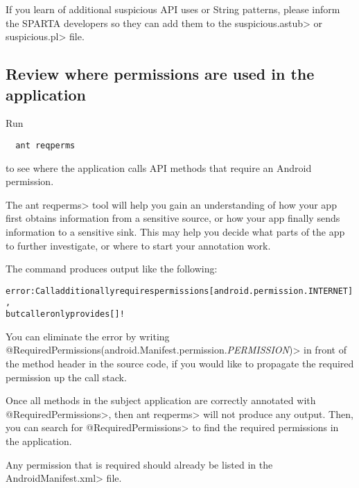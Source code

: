 If you learn of additional suspicious API uses or String patterns, please
inform the SPARTA developers so they can add them to the
\<suspicious.astub> or \<suspicious.pl> file.


\subsection{Review where permissions are used in the application}
\label{sec:appanalysis/reqperms}


Run

\begin{Verbatim}
  ant reqperms
\end{Verbatim}

\noindent
to see where the application calls API methods that require an Android permission.  

The \<ant reqperms> tool will help you gain an understanding of how your
app first obtains information from a sensitive source, or how your app
finally sends information to a sensitive sink.  This may help you decide
what parts of the app to further investigate, or where to start your
annotation work.

The command produces output like the following:
\begin{alltt}
error: Call additionally requires permissions [android.permission.INTERNET], 
   but caller only provides []!
\end{alltt}
You can eliminate the error by writing
\<@RequiredPermissions({android.Manifest.permission.\emph{PERMISSION}})> in
front of the method header in the source code, if you would like to propagate the
required permission up the call stack. 

Once all methods in the subject application are correctly annotated with
\<@RequiredPermissions>, then \<ant reqperms> will not produce any output.
Then, you can search for \<@RequiredPermissions> to find the required
permissions in the application.

Any permission that is required should already be listed in the
\<AndroidManifest.xml> file.

